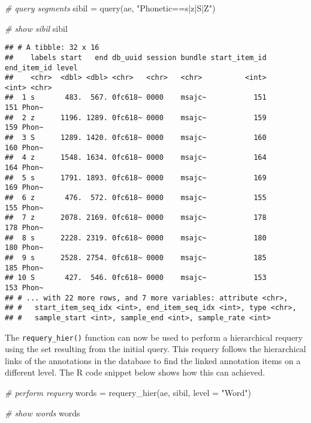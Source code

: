 \documentclass[
]{book}
\newenvironment{Shaded}{\begin{snugshade}}{\end{snugshade}}
\newcommand{\AttributeTok}[1]{\textcolor[rgb]{0.77,0.63,0.00}{#1}}
\newcommand{\CommentTok}[1]{\textcolor[rgb]{0.56,0.35,0.01}{\textit{#1}}}
\newcommand{\FunctionTok}[1]{\textcolor[rgb]{0.00,0.00,0.00}{#1}}
\newcommand{\NormalTok}[1]{#1}
\newcommand{\OtherTok}[1]{\textcolor[rgb]{0.56,0.35,0.01}{#1}}
\newcommand{\StringTok}[1]{\textcolor[rgb]{0.31,0.60,0.02}{#1}}
\begin{document}
\begin{Shaded}
\begin{Highlighting}[]
\CommentTok{\# query segments}
\NormalTok{sibil }\OtherTok{=} \FunctionTok{query}\NormalTok{(ae, }\StringTok{"Phonetic==s|z|S|Z"}\NormalTok{)}

\CommentTok{\# show sibil}
\NormalTok{sibil}
\end{Highlighting}
\end{Shaded}

\begin{verbatim}
## # A tibble: 32 x 16
##    labels start   end db_uuid session bundle start_item_id end_item_id level
##    <chr>  <dbl> <dbl> <chr>   <chr>   <chr>          <int>       <int> <chr>
##  1 s       483.  567. 0fc618~ 0000    msajc~           151         151 Phon~
##  2 z      1196. 1289. 0fc618~ 0000    msajc~           159         159 Phon~
##  3 S      1289. 1420. 0fc618~ 0000    msajc~           160         160 Phon~
##  4 z      1548. 1634. 0fc618~ 0000    msajc~           164         164 Phon~
##  5 s      1791. 1893. 0fc618~ 0000    msajc~           169         169 Phon~
##  6 z       476.  572. 0fc618~ 0000    msajc~           155         155 Phon~
##  7 z      2078. 2169. 0fc618~ 0000    msajc~           178         178 Phon~
##  8 s      2228. 2319. 0fc618~ 0000    msajc~           180         180 Phon~
##  9 s      2528. 2754. 0fc618~ 0000    msajc~           185         185 Phon~
## 10 S       427.  546. 0fc618~ 0000    msajc~           153         153 Phon~
## # ... with 22 more rows, and 7 more variables: attribute <chr>,
## #   start_item_seq_idx <int>, end_item_seq_idx <int>, type <chr>,
## #   sample_start <int>, sample_end <int>, sample_rate <int>
\end{verbatim}

The \texttt{requery\_hier()} function can now be used to perform a hierarchical requery using the set resulting from the initial query. This requery follows the hierarchical links of the annotations in the database to find the linked annotation items on a different level. The R code snippet below shows how this can achieved.

\begin{Shaded}
\begin{Highlighting}[]
\CommentTok{\# perform requery}
\NormalTok{words }\OtherTok{=} \FunctionTok{requery\_hier}\NormalTok{(ae, sibil, }\AttributeTok{level =} \StringTok{"Word"}\NormalTok{)}

\CommentTok{\# show words}
\NormalTok{words}
\end{Highlighting}
\end{Shaded}
\end{document}

